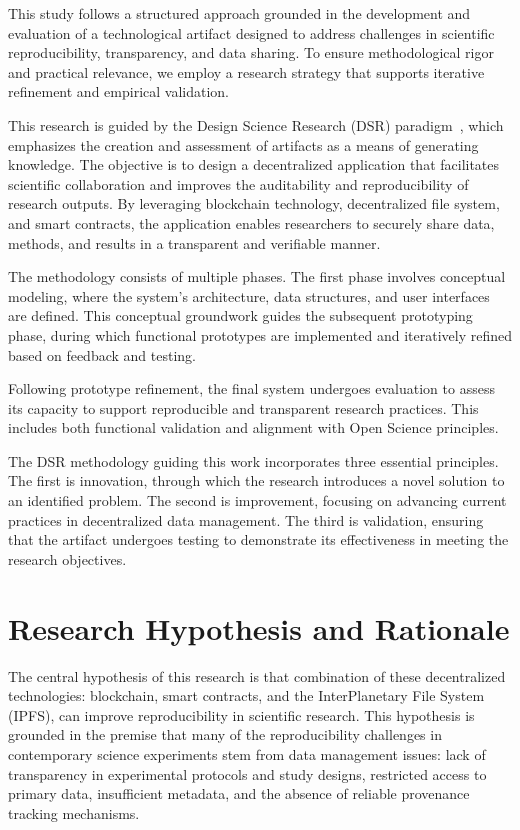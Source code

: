 \documentclass[final]{rc-book-2.14}
\begin{document}
This study follows a structured approach grounded in the development and evaluation of a technological artifact designed to address challenges in scientific reproducibility, transparency, and data sharing. To ensure methodological rigor and practical relevance, we employ a research strategy that supports iterative refinement and empirical validation.

This research is guided by the Design Science Research (DSR) paradigm~\cite{hevner2004design}, which emphasizes the creation and assessment of artifacts as a means of generating knowledge. The objective is to design a decentralized application that facilitates scientific collaboration and improves the auditability and reproducibility of research outputs. By leveraging blockchain technology, decentralized file system, and smart contracts, the application enables researchers to securely share data, methods, and results in a transparent and verifiable manner.

The methodology consists of multiple phases. The first phase involves conceptual modeling, where the system’s architecture, data structures, and user interfaces are defined. This conceptual groundwork guides the subsequent prototyping phase, during which functional prototypes are implemented and iteratively refined based on feedback and testing.

Following prototype refinement, the final system undergoes evaluation to assess its capacity to support reproducible and transparent research practices. This includes both functional validation and alignment with Open Science principles.

The DSR methodology guiding this work incorporates three essential principles. The first is innovation, through which the research introduces a novel solution to an identified problem. The second is improvement, focusing on advancing current practices in decentralized data management. The third is validation, ensuring that the artifact undergoes  testing to demonstrate its effectiveness in meeting the research objectives.


\section{Research Hypothesis and Rationale}
\label{chp:intro:sec:res_hyp}


The central hypothesis of this research is that combination of these decentralized technologies: blockchain, smart contracts, and the InterPlanetary File System (IPFS), can improve reproducibility in scientific research. This hypothesis is grounded in the premise that many of the reproducibility challenges in contemporary science experiments stem from data management issues: lack of transparency in experimental protocols and study designs, restricted access to primary data, insufficient metadata, and the absence of reliable provenance tracking mechanisms. 
\end{document}
